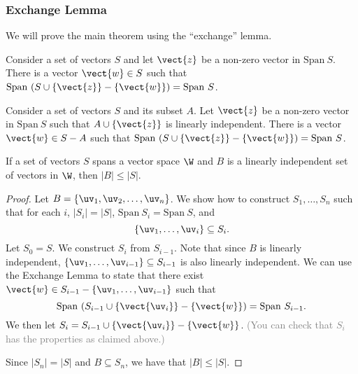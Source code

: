 \begin{frame}
  \frametitle{Exchange Lemma}
  We will prove the main theorem using the ``exchange'' lemma.

  \pause

  \begin{lemma}
    Consider a set of vectors $S$ and let $\vect{z}$ be a non-zero
    vector in $\mathrm{Span}~S$.  There is a vector $\vect{w}\in S$
    such that
    $\mathrm{Span}~(S\cup\{\vect{z}\}-\{\vect{w}\})=\mathrm{Span}~S$.
  \end{lemma}

  \pause
  
  \begin{lemma}
    Consider a set of vectors $S$ and its subset $A$.  Let $\vect{z}$
    be a non-zero vector in $\mathrm{Span}~S$ such that
    $A\cup\{\vect{z}\}$ is linearly independent.  There is a vector
    $\vect{w}\in S-A$ such that
    $\mathrm{Span}~(S\cup\{\vect{z}\}-\{\vect{w}\})=\mathrm{Span}~S$.
  \end{lemma}

  \vspace{1in}
\end{frame}

\begin{frame}
  \begin{lemma}
    If a set of vectors $S$ spans a vector space $\W$ and $B$ is a
    linearly independent set of vectors in $\W$, then $|B|\leq |S|$.
  \end{lemma}
  \pause
  \begin{proof}
    {\footnotesize Let $B=\{\uv_1,\uv_2,\ldots,\uv_n\}$.  We show how to
      construct $S_1,\ldots,S_n$ such that for each $i$, $|S_i|=|S|$,
      $\mathrm{Span}~S_i=\mathrm{Span}~S$, and
      \[
      \{\uv_1,\ldots,\uv_i\}\subseteq S_i.
      \]
      \pause
      Let $S_0=S$.  We construct $S_i$ from $S_{i-1}$.  \pause Note
      that since $B$ is linearly independent,
      $\{\uv_1,\ldots,\uv_{i-1}\}\subseteq S_{i-1}$ is also linearly
      independent. \pause  We can use the Exchange Lemma to state that there
      exist $\vect{w}\in S_{i-1} - \{\uv_1,\ldots,\uv_{i-1}\}$ such
      that
      \[
      \mathrm{Span}~(S_{i-1}\cup\{\vect{\uv_i}\}-\{\vect{w}\})=\mathrm{Span}~S_{i-1}.
      \]
      We then let $S_i=S_{i-1}\cup\{\vect{\uv_i}\}-\{\vect{w}\}$.
      \textcolor{gray}{(You can check that $S_i$ has the properties
        as claimed above.)}

      \pause
      Since $|S_n|=|S|$ and $B\subseteq S_n$, we have that $|B|\leq |S|$.
    }
  \end{proof}
\end{frame}

